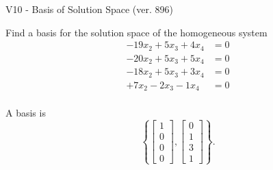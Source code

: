 \begin{exercise}
  \begin{exerciseTitle}V10 - Basis of Solution Space (ver. 896)\end{exerciseTitle}
  \begin{exerciseStatement}
    Find a basis for the solution space of the homogeneous system 
\begin{align*}
 -19 x_ 2 + 5 x_ 3 + 4 x_ 4 &= 0  \\ 
  -20 x_ 2 + 5 x_ 3 + 5 x_ 4 &= 0  \\ 
  -18 x_ 2 + 5 x_ 3 + 3 x_ 4 &= 0  \\ 
  + 7 x_ 2 -2 x_ 3 -1 x_ 4 &= 0  \\ 
 \end{align*}


 
  \end{exerciseStatement}

  \begin{exerciseAnswer}
   A basis is   
\[\left\{\left[\begin{array}{c}
1 \\
0 \\
0 \\
0
\end{array}\right] , \left[\begin{array}{c}
0 \\
1 \\
3 \\
1
\end{array}\right]\right\}.\]

  


  \end{exerciseAnswer}
\end{exercise}